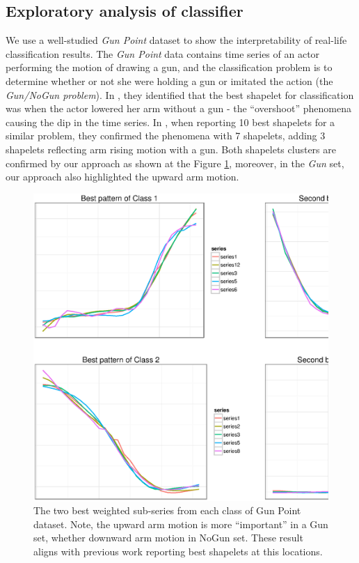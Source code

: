 \documentclass{llncs}
\begin{document}
\subsection{Exploratory analysis of classifier}
We use a well-studied \textit{Gun Point} dataset to show the interpretability of real-life
classification results. The \textit{Gun Point} data contains time series of an actor performing the
motion of drawing a gun, and the classification problem is to determine whether or not she were
holding a gun or imitated the action (the \textit{Gun/NoGun problem}). In \cite{shapelet}, they
identified that the best shapelet for classification was when the actor lowered her arm without a
gun - the ``overshoot'' phenomena causing the dip in the time series. In \cite{bagnal}, when
reporting 10 best shapelets for a similar problem, they confirmed the phenomena with 7 shapelets,
adding 3 shapelets reflecting arm rising motion with a gun. Both shapelets clusters are confirmed by
our approach as shown at the Figure \ref{fig:shapelet-like-patterns}, moreover, in the \textit{Gun}
set, our approach also highlighted the upward arm motion.

\begin{figure}[tbp]
   \centering
   \includegraphics[width=130mm]{figures/shapelet-patterns.ps}
   \caption{The two best weighted sub-series from each class of Gun Point dataset. 
   Note, the upward arm motion is more ``important'' in a Gun set, whether downward arm motion in
NoGun set. These result aligns with previous work \cite{bagnal} reporting best shapelets at this
locations.
}
   \label{fig:shapelet-like-patterns}
\end{figure}
\end{document}
